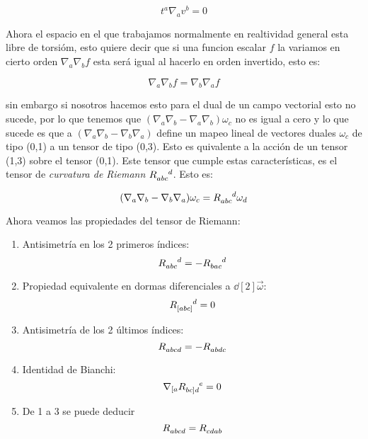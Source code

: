 \documentclass[../Main.tex]{subfiles}
\begin{document}
\begin{equation}
    t^{a}\nabla_{a}v^{b} = 0 
\end{equation}

Ahora el espacio en el que trabajamos normalmente en realtividad general esta libre de torsióm, esto quiere decir que si una funcion escalar $f$ la variamos en cierto orden $\nabla_{a}\nabla_{b}f$ esta será igual al hacerlo en orden invertido, esto es:

\begin{equation}
    \nabla_{a}\nabla_{b}f = \nabla_{b}\nabla_{a}f
\end{equation}

sin embargo si nosotros hacemos esto para el dual de un campo vectorial esto no sucede, por lo que tenemos que $(\nabla_{a}\nabla_{b}-\nabla_{a}\nabla_{b})\omega_{c}$ no es igual a cero y lo que sucede es que a $(\nabla_{a}\nabla_{b}-\nabla_{b}\nabla_{a})$ define un mapeo lineal de vectores duales $\omega_{c}$ de tipo (0,1) a un tensor de tipo (0,3). Esto es quivalente a la acción de un tensor (1,3) sobre el tensor (0,1). Este tensor que cumple estas características, es el tensor de \textit{curvatura de Riemann} $\tensor{R}{_{abc}^{d}}$. Esto es:

\begin{equation}
    (\nabla_{a}\nabla_{b}-\nabla_{b}\nabla_{a})\omega_{c} = \tensor{R}{_{abc}^{d}}\omega_{d}
\end{equation}

Ahora veamos las propiedades del tensor de Riemann:

\begin{enumerate}
    \item Antisimetría en los 2 primeros índices:
    \begin{equation}
        \tensor{R}{_{abc}^{d}} = -\tensor{R}{_{bac}^{d}}
        \label{Riemann:1}
    \end{equation}

    \item Propiedad equivalente en dormas diferenciales a $\dd[2]{\vec{\omega}}$:
    \begin{equation}
        \tensor{R}{_{[abc]}^{d}} = 0
        \label{Riemann:2}
    \end{equation}

    \item Antisimetría de los 2 últimos índices:
    \begin{equation}
        \tensor{R}{_{abcd}} = -\tensor{R}{_{abdc}}
        \label{Riemann:3}
    \end{equation}

    \item Identidad de Bianchi:
    \begin{equation}
        \nabla_{[a}\tensor{R}{_{bc]d}^e} = 0
        \label{Riemann:4}
    \end{equation}

    \item De 1 a 3 se puede deducir
    \begin{equation}
        \tensor{R}{_{abcd}} = \tensor{R}{_{cdab}}
        \label{Riemann:5}
    \end{equation}
\end{enumerate}
\end{document}
